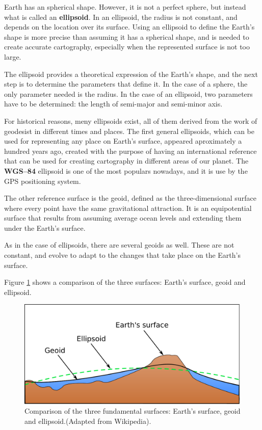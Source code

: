 Earth has an spherical shape. However, it is not a perfect sphere, but instead what is called an \textbf{ellipsoid}. In an ellipsoid, the radius is not constant, and depends on the location over its surface. Using an ellipsoid to define the Earth's shape is more precise than assuming it has a spherical shape, and is needed to create accurate cartography, especially when the represented surface is not too large.

The ellipsoid provides a theoretical expression of the Earth's shape, and the next step is to determine the parameters that define it. In the case of a sphere, the only parameter needed is the radius. In the case of an ellipsoid, two parameters have to be determined: the length of semi-major and semi-minor axis.

For historical reasons, meny ellipsoids exist, all of them derived from the work of geodesist in different times and places. The first general ellipsoids, which can be used for representing any place on Earth's surface, appeared aproximately a hundred years ago, created with the purpose of having an international reference that can be used for creating cartography in different areas of our planet. The \textbf{WGS--84} ellipsoid is one of the most populars nowadays, and it is use by the GPS positioning system. 


The other reference surface is the geoid, defined as the three-dimensional surface where every point have the same gravitational attraction. It is an equipotential surface that results from assuming average ocean levels and extending them under the Earth's surface.

As in the case of ellipsoids, there are several geoids as well. These are not constant, and evolve to adapt to the changes that take place on the Earth's surface.

Figure  \ref{Fig:Three_surfaces} shows a comparison of the three surfaces: Earth's surface, geoid and ellipsoid.

\begin{figure}
\centering
\includegraphics[width=.7\columnwidth]{Cartography/Three_surfaces.pdf}
\caption{\small Comparison of the three fundamental surfaces: Earth's surface, geoid and ellipsoid.(Adapted from Wikipedia).}
\label{Fig:Three_surfaces} 
\end{figure}

